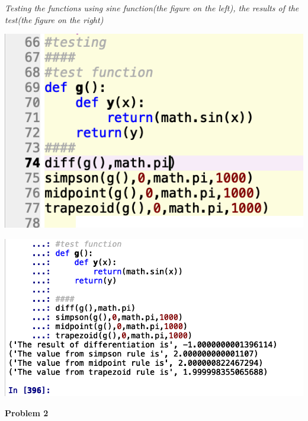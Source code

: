 \documentclass{article}
\begin{document}
\emph{\small{Testing the functions using sine function(the figure on the left), the results of the test(the figure on the right)}}
\begin{center}
\begin{multicols}{2}
	\begin{center}
        \includegraphics[scale=0.5]{Images/pb1test}
        \end{center}
\columnbreak
       \includegraphics[scale=0.37]{Images/pb1testp}
\end{multicols}
\end{center}
\vspace{0.2em}






\vspace{1.5em}
\textbf{Problem 2}\vspace{1.5em}
\end{document}
